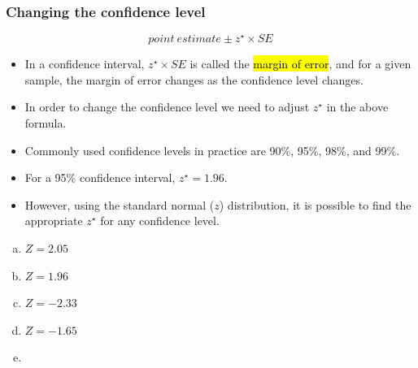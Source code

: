 \begin{frame}
\frametitle{Changing the confidence level}

\[ point~estimate\pm z^\star \times SE \] 

\begin{itemize}

\item In a confidence interval, $z^\star \times SE$ is called the \hl{margin of error}, and for a given sample, the margin of error changes as the confidence level changes.

\item In order to change the confidence level we need to adjust $z^\star$ in the above formula.

\item Commonly used confidence levels in practice are 90\%, 95\%, 98\%, and 99\%.

\item For a 95\% confidence interval, $z^\star = 1.96$.

\item However, using the standard normal ($z$) distribution, it is possible to find the appropriate $z^\star$ for any confidence level.

\end{itemize}

\end{frame}


\begin{frame}


\begin{multicols}{2}
\begin{enumerate}[(a)]
\item $Z = 2.05$
\item $Z = 1.96$
\item $Z = -2.33$
\item $Z = -1.65$
\item[]
\end{enumerate}
\end{multicols}


\end{frame}


